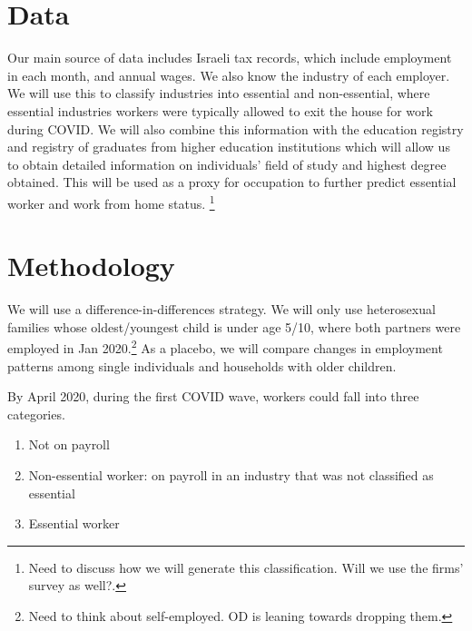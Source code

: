 \documentclass{article}
\begin{document}
\section{Data}
Our main source of data includes Israeli tax records, which include employment in each month, and annual wages. We also know the industry of each employer. We will use this to classify industries into essential and non-essential, where essential industries workers were typically allowed to exit the house for work during COVID. We will also combine this information with the education registry and registry of graduates from higher education institutions which will allow us to obtain detailed information on individuals' field of study and highest degree obtained. This will be used as a proxy for occupation to further predict essential worker and work from home status. \footnote{Need to discuss how we will generate this classification. Will we use the firms' survey as well?.}


\section{Methodology}
We will use a difference-in-differences strategy. We will only use heterosexual families whose oldest/youngest child is under age 5/10, where both partners were employed in Jan 2020.\footnote{Need to think about self-employed. OD is leaning towards dropping them.} 
As a placebo, we will compare changes in employment patterns among single individuals and households with older children.



By April 2020, during the first COVID wave, workers could fall into three categories. 
\begin{enumerate}[start=0]
    \item Not on payroll
    \item Non-essential worker: on payroll in an industry that was not classified as essential
    \item Essential worker
\end{enumerate}
\end{document}
